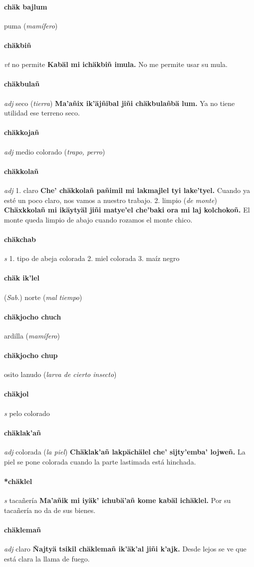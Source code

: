 \documentclass{scrbook}
\newcommand{\entry}[1]{\paragraph{#1}}
\newcommand{\onedefinition}[1]{#1.}
\newcommand{\partofspeech}[1]{\textit{#1}}
\newcommand{\spanishtranslation}[1]{#1}
\newcommand{\clarification}[1]{(\textit{#1})}
\newcommand{\cholexample}[1]{\textbf{#1}}
\newcommand{\exampletranslation}[1]{#1}
\newcommand{\relevantdialect}[1]{(\textit{#1})}
\begin{document}
\begin{multicols}{2}
\entry{chäk bajlum}
\spanishtranslation{puma}
\clarification{mamífero}

\entry{chäkbiñ}
\partofspeech{vt}
\spanishtranslation{no permite}
\cholexample{Kabäl mi ichäkbiñ imula.}
\exampletranslation{No me permite usar su mula.}

\entry{chäkbulañ}
\partofspeech{adj}
\spanishtranslation{seco}
\clarification{tierra}
\cholexample{Ma'añix ik'äjñibal jiñi chäkbulañbä lum.}
\exampletranslation{Ya no tiene utilidad ese terreno seco.}

\entry{chäkkojañ}
\partofspeech{adj}
\spanishtranslation{medio colorado}
\clarification{trapo, perro}

\entry{chäkkolañ}
\partofspeech{adj}
\onedefinition{1}
\spanishtranslation{claro}
\cholexample{Che' chäkkolañ pañimil mi lakmajlel tyi lake'tyel.}
\exampletranslation{Cuando ya esté un poco claro, nos vamos a nuestro trabajo.}
\onedefinition{2}
\spanishtranslation{limpio}
\clarification{de monte}
\cholexample{Chäxkkolañ mi ikäytyäl jiñi matye'el che'baki ora mi laj kolchokoñ.}
\exampletranslation{El monte queda limpio de abajo cuando rozamos el monte chico.}

\entry{chäkchab}
\partofspeech{s}
\onedefinition{1}
\spanishtranslation{tipo de abeja colorada}
\onedefinition{2}
\spanishtranslation{miel colorada}
\onedefinition{3}
\spanishtranslation{maíz negro}

\entry{chäk ik'lel}
\relevantdialect{Sab.}
\spanishtranslation{norte}
\clarification{mal tiempo}

\entry{chäkjocho chuch}
\spanishtranslation{ardilla}
\clarification{mamífero}

\entry{chäkjocho chup}
\spanishtranslation{osito lanudo}
\clarification{larva de cierto insecto}

\entry{chäkjol}
\partofspeech{s}
\spanishtranslation{pelo colorado}

\entry{chäklak'añ}
\partofspeech{adj}
\spanishtranslation{colorada}
\clarification{la piel}
\cholexample{Chäklak'añ lakpächälel che' sijty'emba' lojweñ.}
\exampletranslation{La piel se pone colorada cuando la parte lastimada está hinchada.}

\entry{*chäklel}
\partofspeech{s}
\spanishtranslation{tacañería}
\cholexample{Ma'añik mi iyäk' ichubä'añ kome kabäl ichäklel.}
\exampletranslation{Por su tacañería no da de sus bienes.}

\entry{chäklemañ}
\partofspeech{adj}
\spanishtranslation{claro}
\cholexample{Ñajtyä tsikil chäklemañ ik'äk'al jiñi k'ajk.}
\exampletranslation{Desde lejos se ve que está clara la llama de fuego.}


\end{multicols}
\end{document}
